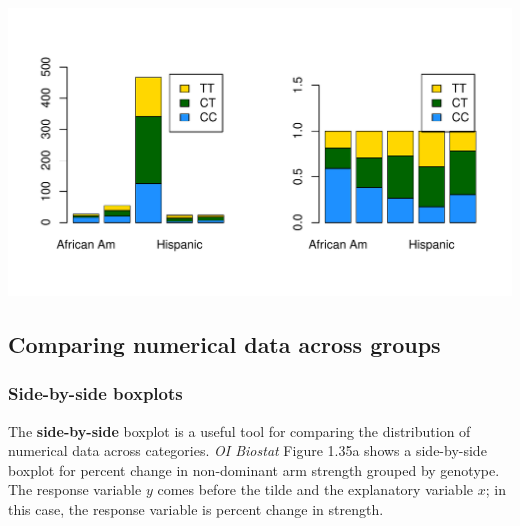 \documentclass{report}\usepackage[]{graphicx}\usepackage[]{color}
\makeatletter
\def\maxwidth{ %
  \ifdim\Gin@nat@width>\linewidth
    \linewidth
  \else
    \Gin@nat@width
  \fi
}
\newenvironment{knitrout}{}{} %
\makeatother
\begin{document}
\begin{knitrout}
{\centering \includegraphics[width=\maxwidth]{figure/unnamed-chunk-69-1} 

}



\end{knitrout}

\subsection{Comparing numerical data across groups}
\subsubsection{Side-by-side boxplots}

The \textbf{side-by-side} boxplot is a useful tool for comparing the distribution of numerical data across categories. \textit{OI Biostat} Figure 1.35a shows a side-by-side boxplot for percent change in non-dominant arm strength grouped by genotype. The response variable $y$ comes before the tilde and the explanatory variable $x$; in this case, the response variable is percent change in strength.
\end{document}
